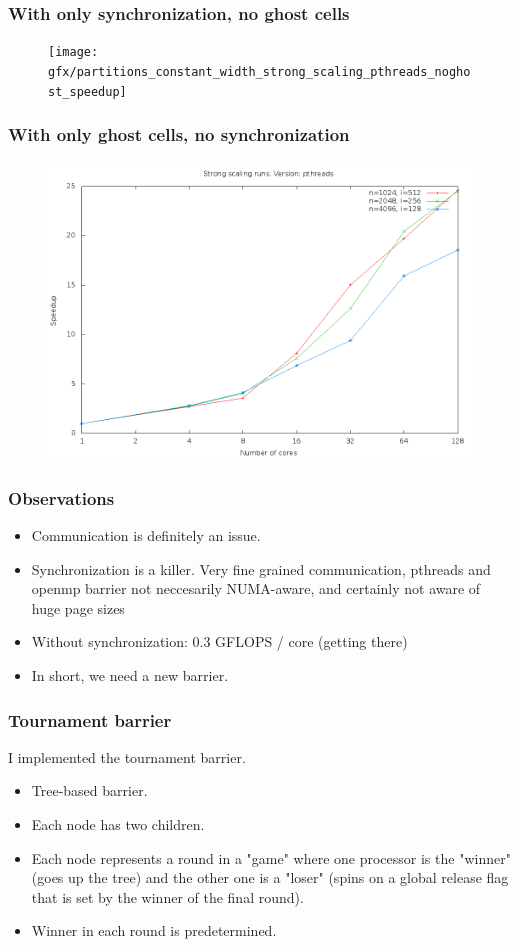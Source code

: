 \documentclass{beamer}
\begin{document}
\begin{frame}
\frametitle{With only synchronization, no ghost cells}
\begin{figure}
\texttt{[image: gfx/partitions\_constant\_width\_strong\_scaling\_pthreads\_noghost\_speedup]}
\end{figure}
\end{frame}

\begin{frame}
\frametitle{With only ghost cells, no synchronization}
\begin{figure}
\includegraphics[width=\textwidth]{gfx/partitions_constant_width_nosync_strong_scaling_pthreads_speedup}
\end{figure}
\end{frame}

\begin{frame}
\frametitle{Observations}
\begin{itemize}
\item Communication is definitely an issue.
\pause 
\item Synchronization is a killer. Very fine grained communication, pthreads and openmp barrier not neccesarily NUMA-aware, and certainly not aware of huge page sizes
\pause
\item Without synchronization: 0.3 GFLOPS / core (getting there)
\pause
\item In short, we need a new barrier.
\end{itemize}
\end{frame}

\begin{frame}
\frametitle{Tournament barrier}
I implemented the tournament barrier.
\begin{itemize}
\item Tree-based barrier.
\pause 
\item Each node has two children.
\pause
\item Each node represents a round in a "game" where one processor is the "winner" (goes up the tree) and the other one is a "loser" (spins on a global release flag that is set by the winner of the final round).
\pause
\item Winner in each round is predetermined.
\end{itemize}
\end{frame}
\end{document}
